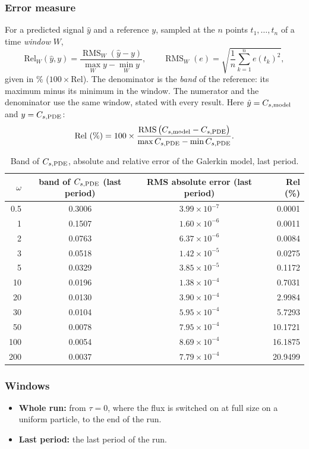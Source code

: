 \documentclass[11pt,a4paper]{article}
\newcommand{\RMS}{\operatorname{RMS}}
\begin{document}
\subsubsection{Error measure}
For a predicted signal $\hat y$ and a reference $y$, sampled at the $n$ points $t_1,\dots,t_n$ of a time \emph{window} $W$,
\begin{equation}\label{eq:rel}
  \mathrm{Rel}_W(\hat y,y) = \frac{\RMS_W(\hat y-y)}{\max_W y-\min_W y},\qquad
  \RMS_W(e)=\sqrt{\frac1n\sum_{k=1}^{n}e(t_k)^2},
\end{equation}
given in \% ($100\times$Rel). The denominator is the \emph{band} of the reference: its maximum minus its minimum in the window. The numerator and the denominator use the same window, stated with every result. Here $\hat y=C_{s,\rm model}$ and $y=C_{s,\rm PDE}$:
\[
  \mathrm{Rel}\ (\%) = 100\times\frac{\RMS\big(C_{s,\rm model}-C_{s,\rm PDE}\big)}{\max C_{s,\rm PDE}-\min C_{s,\rm PDE}}.
\]
\begin{table}[H]\centering\small
\begin{tabular}{rccr}\toprule
$\omega$ & band of $C_{s,\rm PDE}$ (last period) & RMS absolute error (last period) & Rel (\%)\\\midrule
0.5 & 0.3006 & $3.99\times10^{-7}$ & 0.0001\\
1 & 0.1507 & $1.60\times10^{-6}$ & 0.0011\\
2 & 0.0763 & $6.37\times10^{-6}$ & 0.0084\\
3 & 0.0518 & $1.42\times10^{-5}$ & 0.0275\\
5 & 0.0329 & $3.85\times10^{-5}$ & 0.1172\\
10 & 0.0196 & $1.38\times10^{-4}$ & 0.7031\\
20 & 0.0130 & $3.90\times10^{-4}$ & 2.9984\\
30 & 0.0104 & $5.95\times10^{-4}$ & 5.7293\\
50 & 0.0078 & $7.95\times10^{-4}$ & 10.1721\\
100 & 0.0054 & $8.69\times10^{-4}$ & 16.1875\\
200 & 0.0037 & $7.79\times10^{-4}$ & 20.9499\\\bottomrule
\end{tabular}
\caption{Band of $C_{s,\rm PDE}$, absolute and relative error of the Galerkin model, last period.}
\end{table}

\subsubsection{Windows}
\begin{itemize}
  \item \textbf{Whole run:} from $\tau=0$, where the flux is switched on at full size on a uniform particle, to the end of the run.
  \item \textbf{Last period:} the last period of the run.
\end{itemize}
\end{document}
